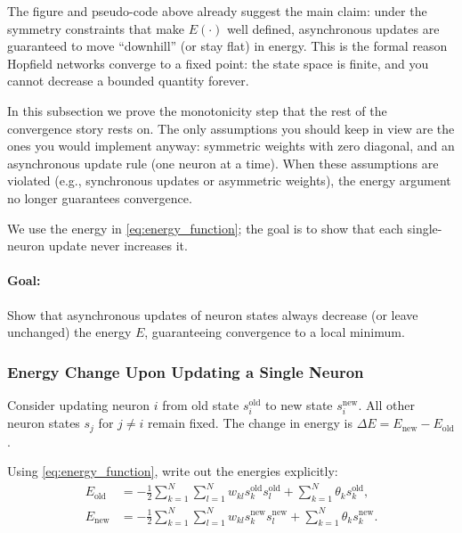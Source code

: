 The figure and pseudo-code above already suggest the main claim: under the symmetry constraints that make \(E(\cdot)\) well defined, asynchronous updates are guaranteed to move ``downhill'' (or stay flat) in energy. This is the formal reason Hopfield networks converge to a fixed point: the state space is finite, and you cannot decrease a bounded quantity forever.

In this subsection we prove the monotonicity step that the rest of the convergence story rests on. The only assumptions you should keep in view are the ones you would implement anyway: symmetric weights with zero diagonal, and an asynchronous update rule (one neuron at a time). When these assumptions are violated (e.g., synchronous updates or asymmetric weights), the energy argument no longer guarantees convergence.

We use the energy in \eqref{eq:energy_function}; the goal is to show that each single-neuron update never increases it.

\paragraph{Goal:} Show that asynchronous updates of neuron states always decrease (or leave unchanged) the energy \( E \), guaranteeing convergence to a local minimum.

\subsubsection{Energy Change Upon Updating a Single Neuron}
\label{sec:hopfield_energy_change_upon_updating_a_single_neuron_sub}

Consider updating neuron \( i \) from old state \( s_i^{\text{old}} \) to new state \( s_i^{\text{new}} \). All other neuron states \( s_j \) for \( j \neq i \) remain fixed. The change in energy is \(\Delta E = E_{\text{new}} - E_{\text{old}}\).

Using \eqref{eq:energy_function}, write out the energies explicitly:
\begin{align*}
    E_{\text{old}} &= -\frac{1}{2} \sum_{k=1}^N \sum_{l=1}^N w_{kl} s_k^{\text{old}} s_l^{\text{old}} + \sum_{k=1}^N \theta_k s_k^{\text{old}}, \\
    E_{\text{new}} &= -\frac{1}{2} \sum_{k=1}^N \sum_{l=1}^N w_{kl} s_k^{\text{new}} s_l^{\text{new}} + \sum_{k=1}^N \theta_k s_k^{\text{new}}.
\end{align*}

